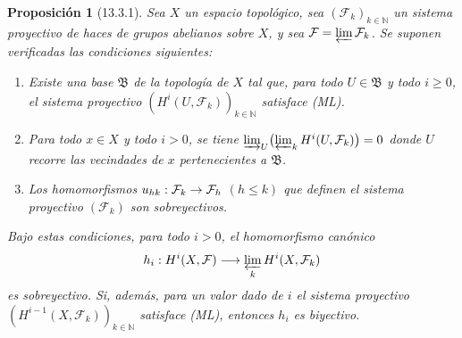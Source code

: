 \documentclass[10pt,oneside,openany]{book}
\theoremstyle{egaenv}\newtheorem*{env}{---}
\theoremstyle{egastatement}
\newtheorem*{proposition}{Proposición}
\theoremstyle{egadescription}
\newcommand{\oldpage}[2][]{\marginnote{\normalfont\scriptsize\textbf{#1}\,|\,#2}\ignorespaces}
\renewcommand{\leq}{\leqslant}
\renewcommand{\geq}{\geqslant}
\renewcommand{\to}{\mathchoice{\longrightarrow}{\rightarrow}{\rightarrow}{\rightarrow}}
\begin{document}
\begin{proposition}[13.3.1]
\label{0.13.3.1}
\label{0.13.3.1-fr}
\oldpage[0\textsubscript{III}]{68}
Sea $X$ un espacio topológico, sea
$(\mathcal F_k)_{k\in\mathbb N}$ un sistema proyectivo de haces de
grupos abelianos sobre $X$, y sea $\mathcal F=\varprojlim\mathcal F_k$.
Se suponen verificadas las condiciones siguientes:
\begin{enumerate}
  \item[{\rm(i)}]
  Existe una base $\mathfrak B$ de la topología de $X$ tal que,
  para todo $U\in\mathfrak B$ y todo $i\geq0$, el sistema
  proyectivo
  $(H^i(U,\mathcal F_k))_{k\in\mathbb N}$ satisface \textup{(ML)}.

  \item[{\rm(ii)}]
  Para todo $x\in X$ y todo $i>0$, se tiene
  $\varinjlim_U\bigl(\varprojlim_k H^i(U,\mathcal F_k)\bigr)=0$
  donde $U$ recorre las vecindades de $x$ pertenecientes a
  $\mathfrak B$.

  \item[{\rm(iii)}]
  Los homomorfismos
  $u_{hk}:\mathcal F_k\to\mathcal F_h$ $(h\leq k)$ que definen el
  sistema proyectivo $(\mathcal F_k)$ son sobreyectivos.
\end{enumerate}
Bajo estas condiciones, para todo $i>0$, el homomorfismo canónico
\[
h_i:H^i(X,\mathcal F)\longrightarrow
\varprojlim_k H^i(X,\mathcal F_k)
\]
es sobreyectivo. Si, además, para un valor dado de $i$ el sistema
proyectivo
$(H^{i-1}(X,\mathcal F_k))_{k\in\mathbb N}$ satisface \textup{(ML)}, entonces $h_i$ es
biyectivo.
\end{proposition}
\end{document}
